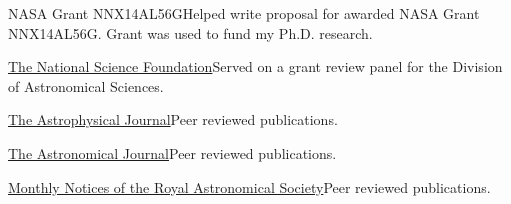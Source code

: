\documentclass[10pt,a4paper]{article}
\begin{document}
\inlineheadsection
  {NASA Grant NNX14AL56G}{Helped write proposal for awarded NASA Grant NNX14AL56G. Grant was used to fund my Ph.D. research.}




\inlineheadsection
  {\href{https://www.nsf.gov/}{The National Science Foundation}}{Served on a grant review panel for the Division of Astronomical Sciences.}

\inlineheadsection
  {\href{http://iopscience.iop.org/journal/0004-637X}{The Astrophysical Journal}}{Peer reviewed publications.}

\inlineheadsection
  {\href{https://iopscience.iop.org/journal/1538-3881}{The Astronomical Journal}}{Peer reviewed publications.}

\inlineheadsection
  {\href{https://academic.oup.com/mnras}{Monthly Notices of the Royal Astronomical Society}}{Peer reviewed publications.}







\end{document}
